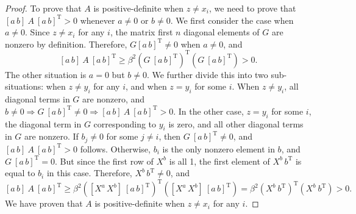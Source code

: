 \begin{proof}
To prove that $A$ is positive-definite when $z\ne x_i$, we need to prove that
$[a\,b]\: A\: [a\,b]^{\mathrm T} > 0$ whenever $a \ne 0$ or $b \ne 0$.
We first consider the case when $a \ne 0$.  Since $z\ne x_i$ for any $i$, the
matrix first $n$ diagonal elements of $G$ are nonzero by definition.
Therefore, $G [a\,b]^{\mathrm{T}} \ne 0$ when $a\ne 0$, and
\[ [a\,b]\: A\: [a\,b]^{\mathrm T} \ge
   \beta^2 \left(G\: [a\,b]^{\mathrm T}\right)^{\mathrm T}
   \left(G\: [a\,b]^{\mathrm T}\right) > 0 . \]
The other situation is $a = 0$ but $b\ne 0$.  We further divide this into
two sub-situations: when $z \ne y_i$ for any $i$, and when $z = y_i$ for some
$i$.  When $z\ne y_i$, all diagonal terms in $G$ are nonzero, and
$b\ne 0 \Longrightarrow G\:[a\,b]^{\mathrm T} \ne 0 \Longrightarrow
[a\,b]\: A\: [a\,b]^{\mathrm T} > 0$.  In the other case, $z = y_i$ for some
$i$, the diagonal term in $G$ corresponding to $y_i$ is zero, and all other
diagonal terms in $G$ are nonzero.  If $b_j \ne 0$ for some $j\ne i$, then
$G\:[a\,b]^{\mathrm T} \ne 0$, and $[a\,b]\: A\: [a\,b]^{\mathrm T} > 0$
follows.  Otherwise, $b_i$ is the only nonzero element in $b$, and
$G\:[a\,b]^{\mathrm T} = 0$.  But since the first row of $X^b$ is all 1,
the first element of $X^b\,b^{\mathrm T}$ is equal to $b_i$ in this case.
Therefore, $X^b\,b^{\mathrm T}\ne 0$, and
\[ [a\,b]\: A\: [a\,b]^{\mathrm T} \ge
   \beta^2 \left([X^a\,X^b]\: [a\,b]^{\mathrm T}\right)^{\mathrm T}
   \left([X^a\,X^b]\: [a\,b]^{\mathrm T}\right) =
   \beta^2 \left(X^b\: b^{\mathrm T}\right)^{\mathrm T}
   \left(X^b\: b^{\mathrm T}\right) > 0 . \]
We have proven that $A$ is positive-definite when $z\ne x_i$ for any $i$.


\end{proof}
